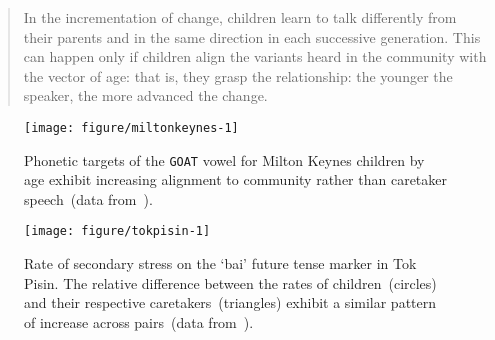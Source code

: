 \begin{quote}
In the incrementation of change, children learn to talk differently from their parents and in the same direction in each successive generation. This can happen only if children align the variants heard in the community with the vector of age: that is, they grasp the relationship: the younger the speaker, the more advanced the change.~\citep[p.344]{Labov2001}
\end{quote}



\begin{figure}[t]

{\centering \texttt{[image: figure/miltonkeynes-1]} 

}

\caption[With age, Milton Keynes children exhibit increasing alignment to community rather than caretaker speech.]{Phonetic targets of the \texttt{GOAT} vowel for Milton Keynes children by age exhibit increasing alignment to community rather than caretaker speech~(data from~\citealt{Kerswill1994}).}\label{fig:miltonkeynes}
\end{figure}



\begin{figure}[t]

{\centering \texttt{[image: figure/tokpisin-1]} 

}

\caption[Rate of secondary stress on the `bai' future tense marker in Tok Pisin]{Rate of secondary stress on the `bai' future tense marker in Tok Pisin. The relative difference between the rates of children~(circles) and their respective caretakers~(triangles) exhibit a similar pattern of increase across pairs~(data from~\citealt[p.425]{Labov2001}).}\label{fig:tokpisin}
\end{figure}





